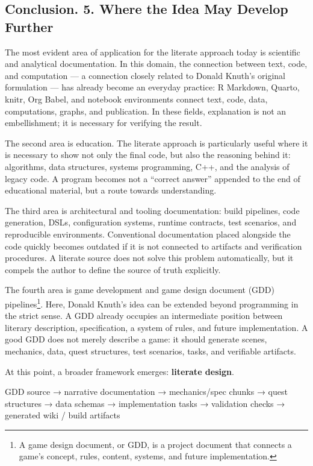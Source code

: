 \documentclass{ZGJournalArticle_2026}
\newenvironment{Shaded}{}{}
\newcommand{\NormalTok}[1]{#1}
\begin{document}
\subsection{Conclusion. 5. Where the Idea May Develop
Further}\label{conclusion.-5.-where-the-idea-may-develop-further}

The most evident area of application for the literate approach today is
scientific and analytical documentation. In this domain, the connection
between text, code, and computation --- a connection closely related to
Donald Knuth's original formulation --- has already become an everyday
practice: R Markdown, Quarto, knitr, Org Babel, and notebook
environments connect text, code, data, computations, graphs, and
publication. In these fields, explanation is not an embellishment; it is
necessary for verifying the result.

The second area is education. The literate approach is particularly
useful where it is necessary to show not only the final code, but also
the reasoning behind it: algorithms, data structures, systems
programming, C++, and the analysis of legacy code. A program becomes not
a ``correct answer'' appended to the end of educational material, but a
route towards understanding.

The third area is architectural and tooling documentation: build
pipelines, code generation, DSLs, configuration systems, runtime
contracts, test scenarios, and reproducible environments. Conventional
documentation placed alongside the code quickly becomes outdated if it
is not connected to artifacts and verification procedures. A literate
source does not solve this problem automatically, but it compels the
author to define the source of truth explicitly.

The fourth area is game development and game design document (GDD)
pipelines\footnote{A game design document, or GDD, is a project document
  that connects a game's concept, rules, content, systems, and future
  implementation.}. Here, Donald Knuth's idea can be extended beyond
programming in the strict sense. A GDD already occupies an intermediate
position between literary description, specification, a system of rules,
and future implementation. A good GDD does not merely describe a game:
it should generate scenes, mechanics, data, quest structures, test
scenarios, tasks, and verifiable artifacts.

At this point, a broader framework emerges: \textbf{literate design}.

\begin{Shaded}
\begin{Highlighting}[]
\NormalTok{GDD source}
\NormalTok{  → narrative documentation}
\NormalTok{  → mechanics/spec chunks}
\NormalTok{  → quest structures}
\NormalTok{  → data schemas}
\NormalTok{  → implementation tasks}
\NormalTok{  → validation checks}
\NormalTok{  → generated wiki / build artifacts}
\end{Highlighting}
\end{Shaded}
\end{document}
